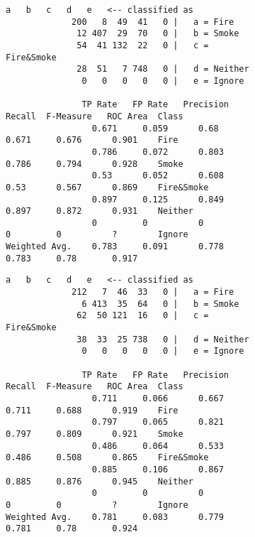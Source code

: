 \begin{figure}[h]
    \centering
    \footnotesize
    \renewcommand{\thesubfigure}{\arabic{subfigure}}
 
    \begin{subfigure}[b]{\textwidth}
    \caption{}
    \label{fig:cmatrix01}
    \begin{lstlisting}[language={}, basicstyle=\footnotesize, frame=none, basewidth=0.45em]
			   a   b   c   d   e   <-- classified as
			 200   8  49  41   0 |   a = Fire
			  12 407  29  70   0 |   b = Smoke
			  54  41 132  22   0 |   c = Fire&Smoke
			  28  51   7 748   0 |   d = Neither
			   0   0   0   0   0 |   e = Ignore

               TP Rate   FP Rate   Precision   Recall  F-Measure   ROC Area  Class
                 0.671     0.059      0.68      0.671     0.676      0.901    Fire
                 0.786     0.072      0.803     0.786     0.794      0.928    Smoke
                 0.53      0.052      0.608     0.53      0.567      0.869    Fire&Smoke
                 0.897     0.125      0.849     0.897     0.872      0.931    Neither
                 0         0          0         0         0          ?        Ignore
Weighted Avg.    0.783     0.091      0.778     0.783     0.78       0.917
    \end{lstlisting} 
    \end{subfigure}


    \begin{subfigure}[b]{\textwidth}
    \caption{}
    \label{fig:cmatrix02}
    \begin{lstlisting}[language={}, basicstyle=\footnotesize, frame=none, basewidth=0.45em]
			   a   b   c   d   e   <-- classified as
			 212   7  46  33   0 |   a = Fire
			   6 413  35  64   0 |   b = Smoke
			  62  50 121  16   0 |   c = Fire&Smoke
			  38  33  25 738   0 |   d = Neither
			   0   0   0   0   0 |   e = Ignore

               TP Rate   FP Rate   Precision   Recall  F-Measure   ROC Area  Class
                 0.711     0.066      0.667     0.711     0.688      0.919    Fire
                 0.797     0.065      0.821     0.797     0.809      0.921    Smoke
                 0.486     0.064      0.533     0.486     0.508      0.865    Fire&Smoke
                 0.885     0.106      0.867     0.885     0.876      0.945    Neither
                 0         0          0         0         0          ?        Ignore
Weighted Avg.    0.781     0.083      0.779     0.781     0.78       0.924
    \end{lstlisting}
    \end{subfigure} 
    

\end{figure}
